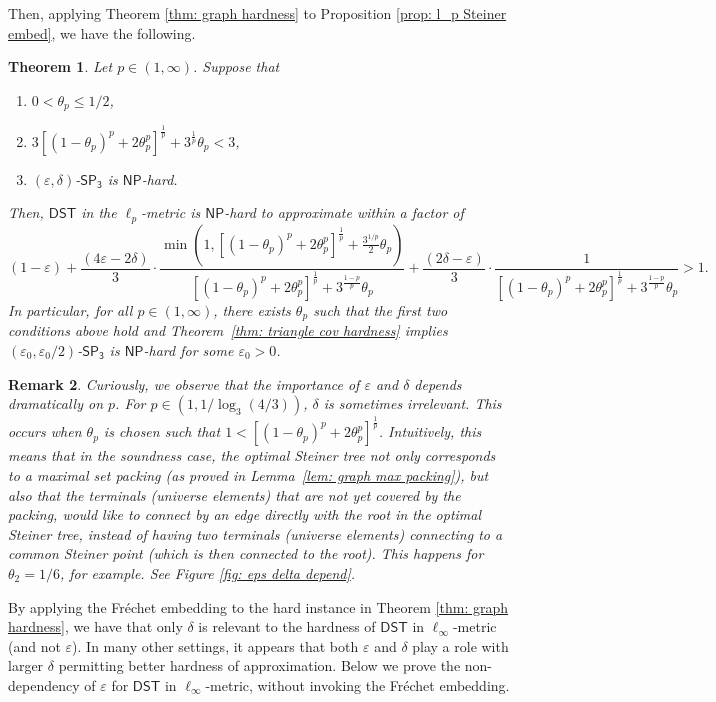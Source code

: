 \documentclass{article}\providecommand{\DeclareRedundantLanguages}[2]{}\usepackage[a4paper,margin=20mm]{geometry}
\newtheorem{theorem}{Theorem}\newtheorem{lemma}[theorem]{Lemma}\newtheorem{proposition}[theorem]{Proposition}\newtheorem{corollary}[theorem]{Corollary}\newtheorem{definition}[theorem]{Definition}\newtheorem{claim}[theorem]{Claim}\newtheorem{remark}[theorem]{Remark}\newtheorem{observation}[theorem]{Observation}\newtheorem{conjecture}[theorem]{Conjecture}\newtheorem{example}[theorem]{Example}
\newcommand{\1}{\textbf{1}}
\newcommand{\setpT}{$\mathsf{SP_3}$\xspace}
\newcommand{\dst}{$\mathsf{DST}$\xspace}
\newcommand{\np}{$\mathsf{NP}$\xspace}
\newcommand{\pcoord}{\theta_p}
\begin{document}
Then, applying Theorem \ref{thm: graph hardness} to Proposition \ref{prop: l_p Steiner embed}, we have the following.
\begin{theorem} \label{thm: hardness of lp dst}
Let $p \in (1, \infty)$. Suppose that 
\begin{enumerate}
    \item $0 < \pcoord \leq 1/2$,
    \item $3[(1-\pcoord)^p + 2\pcoord^p]^{\frac{1}{p}} + 3^{\frac{1}{p}}\pcoord < 3$,
    \item $(\varepsilon, \delta)$-\setpT is \np-hard.
\end{enumerate}
Then,  \dst in the  $\ell_p$-metric  is \np-hard to approximate within a factor of 
\[
(1 - \varepsilon) + \frac{(4\varepsilon  - 2\delta)}{3} \cdot \frac{\min(1, [(1-\pcoord)^p + 2\pcoord^p]^{\frac{1}{p}} +\frac{3^{1/p}}{2}\pcoord)}{[(1-\pcoord)^p + 2\pcoord^p]^{\frac{1}{p}} + 3^{\frac{1-p}{p}}\pcoord} + \frac{(2\delta  - \varepsilon)}{3} \cdot \frac {1}{[(1-\pcoord)^p + 2\pcoord^p]^{\frac{1}{p}} + 3^{\frac{1-p}{p}}\pcoord}> 1.
\]
In particular, for all $p \in (1,\infty)$, there exists $\pcoord$ such that the first two conditions above hold and Theorem~\ref{thm: triangle cov hardness} implies $(\varepsilon_0,\varepsilon_0/2)$-\setpT is \np-hard for some $\varepsilon_0>0$.
\end{theorem}
\begin{remark} \label{rmk: role of eps and delta}
Curiously, we observe that the importance of $\varepsilon$ and $\delta$ depends dramatically on $p$. For $p \in (1, 1/\log_3(4/3))$, $\delta$ is sometimes irrelevant. This occurs when $\theta_p$ is chosen such that $1 < [(1-\pcoord)^p + 2\pcoord^p]^{\frac{1}{p}}$. Intuitively, this means that in the soundness case, the optimal Steiner tree not only corresponds to a maximal set packing (as proved in Lemma~\ref{lem: graph max packing}), but also that the terminals (universe elements) that are not yet covered by the packing, would like to connect by an edge directly with the root in the optimal Steiner tree, instead of having two terminals (universe elements) connecting to a common Steiner point (which is then connected to the root). This happens for $\theta_2 = 1/6$, for example. See Figure \ref{fig: eps delta depend}.
\end{remark}

By applying the Fr\'echet embedding to the hard instance in Theorem \ref{thm: graph hardness},  we have that only $\delta$ is relevant to the hardness of  \dst in $\ell_{\infty}$-metric (and not $\varepsilon$). 
In many other settings, it appears that both $\varepsilon$ and $\delta$ play a role with larger $\delta$ permitting better hardness of approximation. Below we prove the non-dependency of $\varepsilon$ for \dst in $\ell_\infty$-metric, without invoking the Fr\'echet embedding.
\end{document}
